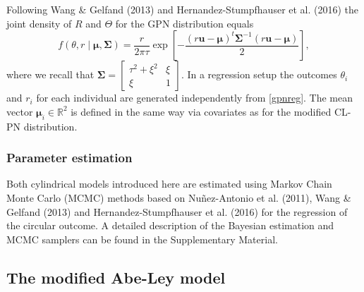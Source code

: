\documentclass[12pt,]{article}
\begin{document}
Following Wang \& Gelfand (2013) and Hernandez-Stumpfhauser et al.
(2016) the joint density of \(R\) and \(\Theta\) for the GPN
distribution equals \begin{equation}\label{gpnreg}
f(\theta, r \mid \boldsymbol{\mu}, \boldsymbol{\Sigma}) = \frac{r}{2\pi\tau} \exp\left[ -\frac{(r\boldsymbol{u}-\boldsymbol{\mu})^{t}\boldsymbol{\Sigma}^{-1}(r\boldsymbol{u}-\boldsymbol{\mu})}{2}\right],
\end{equation} \noindent where we recall that
\(\boldsymbol{\Sigma} = \begin{bmatrix} \tau^2 + \xi^2 & \xi\\ \xi & 1 \end{bmatrix}\).
In a regression setup the outcomes \(\theta_i\) and \(r_i\) for each
individual are generated independently from \eqref{gpnreg}. The mean
vector \(\boldsymbol{\mu}_i \in \mathbb{R}^2\) is defined in the same
way via covariates as for the modified CL-PN distribution.

\subsubsection{Parameter estimation}

Both cylindrical models introduced here are estimated using Markov Chain
Monte Carlo (MCMC) methods based on Nuñez-Antonio et al. (2011), Wang \&
Gelfand (2013) and Hernandez-Stumpfhauser et al. (2016) for the
regression of the circular outcome. A detailed description of the
Bayesian estimation and MCMC samplers can be found in the Supplementary
Material.

\subsection{The modified Abe-Ley model}\label{WeiSSVM}
\end{document}

